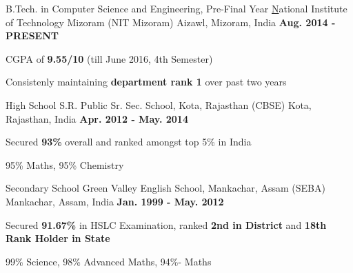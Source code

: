 \begin{cventries}
  \cventry
    {B.Tech. in Computer Science and Engineering, Pre-Final Year}
    {\href{http://nitmz.ac.in/} National Institute of Technology Mizoram (NIT Mizoram)}
    {Aizawl, Mizoram, India}
    {\textbf{Aug. 2014 - PRESENT}}
    {
      \begin{cvitems}
        \item {CGPA of \textbf{9.55/10} (till June 2016, 4th Semester)}
        \item {Consistenly maintaining \textbf{department rank 1} over past two years}
      \end{cvitems}
    }
\cventry
    {High School}
    {S.R. Public Sr. Sec. School, Kota, Rajasthan (CBSE)}
    {Kota, Rajasthan, India}
    {\textbf{Apr. 2012 - May. 2014}}
    {
      \begin{cvitems}
        \item {Secured \textbf{93\%} overall and ranked amongst top 5\% in India }
        \item {95\% Maths, 95\% Chemistry }
      \end{cvitems}
    }
 \cventry
    {Secondary School}
    {Green Valley English School, Mankachar, Assam (SEBA)}
    {Mankachar, Assam, India}
    {\textbf{Jan. 1999 - May. 2012}}
    {
      \begin{cvitems}
        \item {Secured \textbf{91.67\%} in HSLC Examination, ranked \textbf{2nd in District} and \textbf{18th Rank Holder in State}}
        \item {99\% Science,  98\% Advanced Maths,  94\%- Maths}
      \end{cvitems}
    }
\end{cventries}
